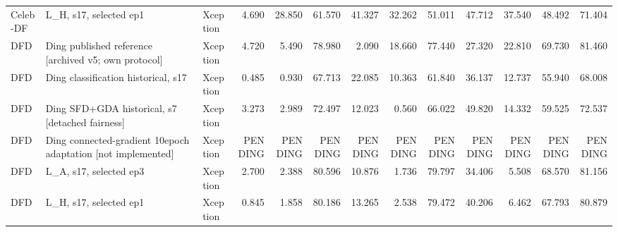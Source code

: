 \begin{table}[t]
{\begin{tabular}{lllrrrrrrrrrr}
Celeb-DF & L\_H, s17, selected ep1 & Xception & 4.690 & 28.850 & 61.570 & 41.327 & 32.262 & 51.011 & 47.712 & 37.540 & 48.492 & 71.404 \\
DFD & Ding published reference [archived v5; own protocol] & Xception & 4.720 & 5.490 & 78.980 & 2.090 & 18.660 & 77.440 & 27.320 & 22.810 & 69.730 & 81.460 \\
DFD & Ding classification historical, s17 & Xception & 0.485 & 0.930 & 67.713 & 22.085 & 10.363 & 61.840 & 36.137 & 12.737 & 55.940 & 68.008 \\
DFD & Ding SFD+GDA historical, s7 [detached fairness] & Xception & 3.273 & 2.989 & 72.497 & 12.023 & 0.560 & 66.022 & 49.820 & 14.332 & 59.525 & 72.537 \\
DFD & Ding connected-gradient 10epoch adaptation [not implemented] & Xception & PENDING & PENDING & PENDING & PENDING & PENDING & PENDING & PENDING & PENDING & PENDING & PENDING \\
DFD & L\_A, s17, selected ep3 & Xception & 2.700 & 2.388 & 80.596 & 10.876 & 1.736 & 79.797 & 34.406 & 5.508 & 68.570 & 81.156 \\
DFD & L\_H, s17, selected ep1 & Xception & 0.845 & 1.858 & 80.186 & 13.265 & 2.538 & 79.472 & 40.206 & 6.462 & 67.793 & 80.879 \\
\bottomrule
\end{tabular}}
\end{table}

